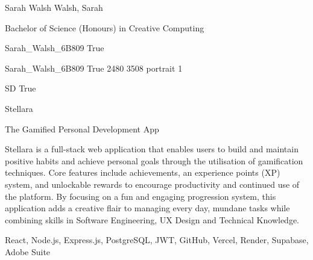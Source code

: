 \documentclass[twoside]{report}
\begin{document}
\begingroup{}\relax



\def\Key{Sarah_Walsh_6B809}

{Sarah Walsh}
{Walsh, Sarah}

{Bachelor of Science (Honours) in Creative Computing}

{Sarah_Walsh_6B809}
{True}

{Sarah_Walsh_6B809}
{True}
{2480}
{3508}
{portrait}
{1}

{SD}
{True}

{Stellara}

{The Gamified Personal Development App}

{Stellara is a full-stack web application that enables users to build and maintain positive habits and achieve personal goals through the utilisation of gamification techniques. Core features include achievements, an experience points (XP) system, and unlockable rewards to encourage productivity and continued use of the platform. By focusing on a fun and engaging progression system, this application adds a creative flair to managing every day, mundane tasks while combining skills in Software Engineering, UX Design and Technical Knowledge.}

{React, Node.js, Express.js, PostgreSQL, JWT, GitHub, Vercel, Render, Supabase, Adobe Suite}
\end{document}
